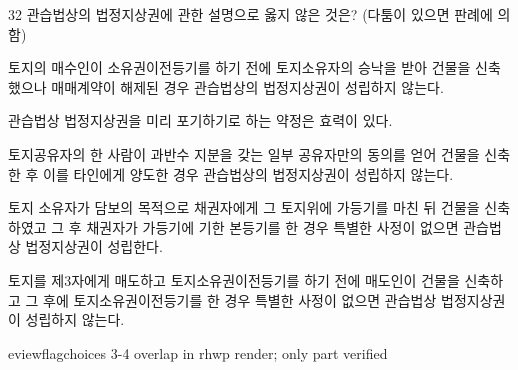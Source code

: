 \begin{question}{32}
관습법상의 법정지상권에 관한 설명으로 옳지 않은 것은? (다툼이 있으면 판례에 의함)
\begin{choices}
  \item 토지의 매수인이 소유권이전등기를 하기 전에 토지소유자의 승낙을 받아 건물을 신축했으나 매매계약이 해제된 경우 관습법상의 법정지상권이 성립하지 않는다.
  \item 관습법상 법정지상권을 미리 포기하기로 하는 약정은 효력이 있다.
  \item 토지공유자의 한 사람이 과반수 지분을 갖는 일부 공유자만의 동의를 얻어 건물을 신축한 후 이를 타인에게 양도한 경우 관습법상의 법정지상권이 성립하지 않는다.
  \item 토지 소유자가 담보의 목적으로 채권자에게 그 토지위에 가등기를 마친 뒤 건물을 신축하였고 그 후 채권자가 가등기에 기한 본등기를 한 경우 특별한 사정이 없으면 관습법상 법정지상권이 성립한다.
  \item 토지를 제3자에게 매도하고 토지소유권이전등기를 하기 전에 매도인이 건물을 신축하고 그 후에 토지소유권이전등기를 한 경우 특별한 사정이 없으면 관습법상 법정지상권이 성립하지 않는다.
\end{choices}

eviewflag{choices 3-4 overlap in rhwp render; only part verified}
\end{question}
